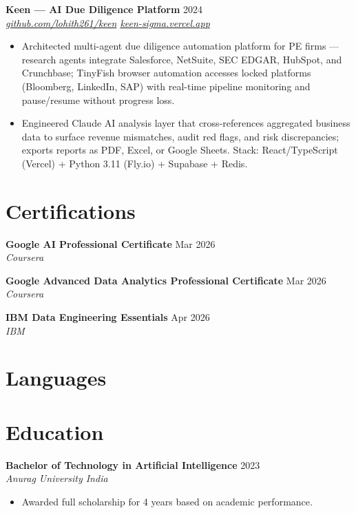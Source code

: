 \documentclass[10pt,letterpaper]{article}
\newcommand{\entry}[3]{%
  \vspace{3pt}\textbf{#1} \hfill #3 \\
  \textit{\small #2}\vspace{1pt}}
\begin{document}
\entry{Keen --- AI Due Diligence Platform}{\href{https://github.com/lohith261/keen}{github.com/lohith261/keen} \quad\textbullet\quad \href{https://keen-sigma.vercel.app/}{keen-sigma.vercel.app}}{2024}
\begin{itemize}
  \item Architected multi-agent due diligence automation platform for PE firms --- research agents integrate Salesforce, NetSuite, SEC EDGAR, HubSpot, and Crunchbase; TinyFish browser automation accesses locked platforms (Bloomberg, LinkedIn, SAP) with real-time pipeline monitoring and pause/resume without progress loss.
  \item Engineered Claude AI analysis layer that cross-references aggregated business data to surface revenue mismatches, audit red flags, and risk discrepancies; exports reports as PDF, Excel, or Google Sheets. Stack: React/TypeScript (Vercel) + Python 3.11 (Fly.io) + Supabase + Redis.
\end{itemize}

\section{Certifications}

\textbf{Google AI Professional Certificate} \hfill Mar 2026 \\
\textit{Coursera}

\textbf{Google Advanced Data Analytics Professional Certificate} \hfill Mar 2026 \\
\textit{Coursera}

\textbf{IBM Data Engineering Essentials} \hfill Apr 2026 \\
\textit{IBM}

\section{Languages}


\section{Education}

\entry{Bachelor of Technology in Artificial Intelligence}{Anurag University \textbullet{} India}{2023}
\begin{itemize}
  \item Awarded full scholarship for 4 years based on academic performance.
\end{itemize}
\end{document}
